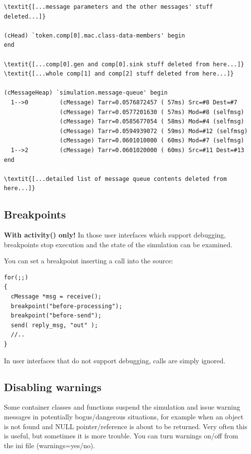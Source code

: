 \begin{Verbatim}[commandchars=\\\{\}]
\textit{[...message parameters and the other messages' stuff deleted...]}

(cHead) `token.comp[0].mac.class-data-members' begin
end

\textit{[...comp[0].gen and comp[0].sink stuff deleted from here...]}
\textit{[...whole comp[1] and comp[2] stuff deleted from here...]}

(cMessageHeap) `simulation.message-queue' begin
  1-->0         (cMessage) Tarr=0.0576872457 ( 57ms) Src=#8 Dest=#7
                (cMessage) Tarr=0.0577201630 ( 57ms) Mod=#8 (selfmsg)
                (cMessage) Tarr=0.0585677054 ( 58ms) Mod=#4 (selfmsg)
                (cMessage) Tarr=0.0594939072 ( 59ms) Mod=#12 (selfmsg)
                (cMessage) Tarr=0.0601010000 ( 60ms) Mod=#7 (selfmsg)
  1-->2         (cMessage) Tarr=0.0601020000 ( 60ms) Src=#11 Dest=#13
end

\textit{[...detailed list of message queue contents deleted from here...]}
\end{Verbatim}





\subsection{Breakpoints}

\textbf{With activity() only!} In those user interfaces which support
debugging, breakpoints stop execution and the state of the simulation
can be examined.

You can set a breakpoint inserting a
 call into the source:

\begin{verbatim}
for(;;)
{
  cMessage *msg = receive();
  breakpoint("before-processing");
  breakpoint("before-send");
  send( reply_msg, "out" );
  //..
}
\end{verbatim}


In user interfaces that do not support debugging, 
calls are simply ignored.





\subsection{Disabling warnings}

Some container classes and functions suspend the simulation and issue
warning messages in potentially bogus/dangerous situations, for
example when an object is not found and NULL pointer/reference is
about to be returned. Very often this is useful, but sometimes it is
more trouble. You can turn warnings on/off from the ini file
(warnings=yes/no).


